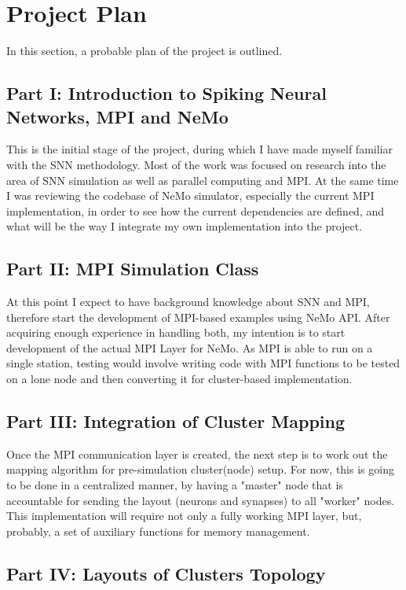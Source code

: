 \documentclass[12pt]{report}
\begin{document}
\section{Project Plan}

In this section, a probable plan of the project is outlined.

\subsection{Part I: Introduction to Spiking Neural Networks, MPI and NeMo}

This is the initial stage of the project, during which I have made myself familiar with the SNN methodology. Most of the work was focused on research into the area of SNN simulation 
as well as parallel computing and MPI. At the same time I was reviewing the codebase of NeMo simulator, especially the current MPI implementation, in order to see how the current dependencies 
are defined, and what will be the way I integrate my own implementation into the project.

\subsection{Part II: MPI Simulation Class}

At this point I expect to have background knowledge about SNN and MPI, therefore start the development of MPI-based examples using NeMo API. After acquiring enough experience in handling
both, my intention is to start development of the actual MPI Layer for NeMo. As MPI is able to run on a single station, testing would involve writing code with MPI functions to be tested 
on a lone node and then converting it for cluster-based implementation.

\subsection{Part III: Integration of Cluster Mapping}

Once the MPI communication layer is created, the next step is to work out the mapping algorithm for pre-simulation cluster(node) setup. For now, this is going to be done in a centralized 
manner, by having a "master" node that is accountable for sending the layout (neurons and synapses) to all "worker" nodes. This implementation will require not only a fully working MPI layer,
but, probably, a set of auxiliary functions for memory management.

\subsection{Part IV: Layouts of Clusters Topology}
\end{document}
